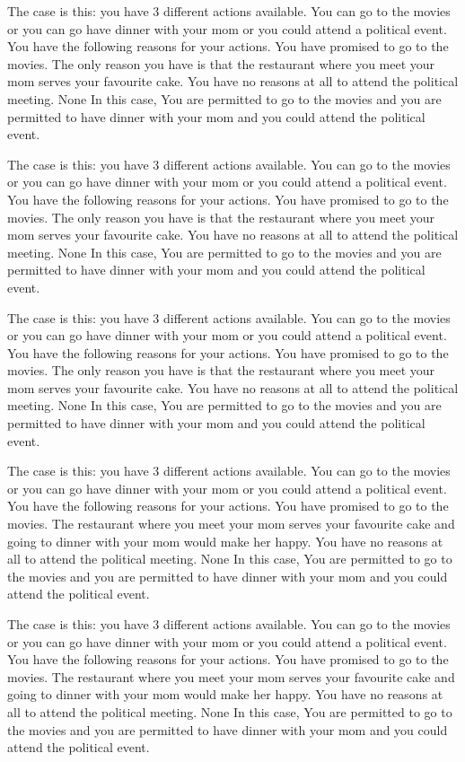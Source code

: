 The case is this: you have  3  different actions available.  You can go to the movies or you can go have dinner with your mom or you could attend a political event.
You have the following reasons for your actions.  You have promised to go to the movies. The only reason you have is that the restaurant where you meet your mom serves your favourite cake. You have no reasons at all to attend the political meeting. 
None
In this case,  You are permitted to go to the movies and you are permitted to have dinner with your mom and you could attend the political event.
 
The case is this: you have  3  different actions available.  You can go to the movies or you can go have dinner with your mom or you could attend a political event.
You have the following reasons for your actions.  You have promised to go to the movies. The only reason you have is that the restaurant where you meet your mom serves your favourite cake. You have no reasons at all to attend the political meeting. 
None
In this case,  You are permitted to go to the movies and you are permitted to have dinner with your mom and you could attend the political event.
 
The case is this: you have  3  different actions available.  You can go to the movies or you can go have dinner with your mom or you could attend a political event.
You have the following reasons for your actions.  You have promised to go to the movies. The only reason you have is that the restaurant where you meet your mom serves your favourite cake. You have no reasons at all to attend the political meeting. 
None
In this case,  You are permitted to go to the movies and you are permitted to have dinner with your mom and you could attend the political event.
 
The case is this: you have  3  different actions available.  You can go to the movies or you can go have dinner with your mom or you could attend a political event.
You have the following reasons for your actions.  You have promised to go to the movies. The restaurant where you meet your mom serves your favourite cake and going to dinner with your mom would make her happy. You have no reasons at all to attend the political meeting. 
None
In this case,  You are permitted to go to the movies and you are permitted to have dinner with your mom and you could attend the political event.
 
The case is this: you have  3  different actions available.  You can go to the movies or you can go have dinner with your mom or you could attend a political event.
You have the following reasons for your actions.  You have promised to go to the movies. The restaurant where you meet your mom serves your favourite cake and going to dinner with your mom would make her happy. You have no reasons at all to attend the political meeting. 
None
In this case,  You are permitted to go to the movies and you are permitted to have dinner with your mom and you could attend the political event.
 
